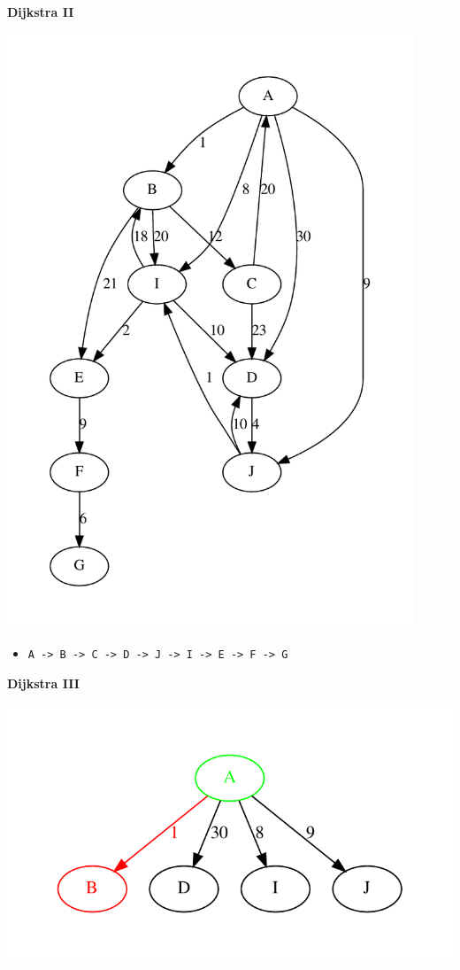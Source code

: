 \newpage
{\samepage
\begin{center}
{\Large{\bf Dijkstra II}}
\end{center}
\begin{center}
\includegraphics[height=7in]{../Images/Linkedg.pdf}
\end{center}
\begin{itemize}
\item \verb^A -> B -> C -> D -> J -> I -> E -> F -> G^
\end{itemize}
}

\newpage
{\samepage
\begin{center}
{\Large{\bf Dijkstra III}}
\end{center}
\begin{center}
\includegraphics[width=\textwidth]{../Images/dijkstra1.pdf}
\end{center}
}

